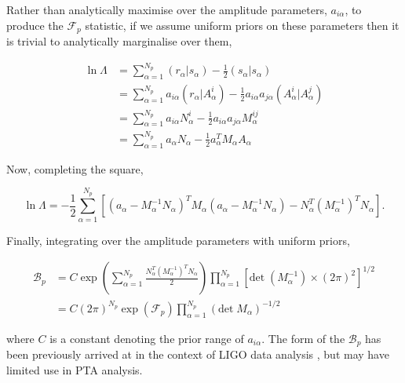 \documentclass[prd,showpacs,nofootinbib]{revtex4}
\begin{document}
Rather than analytically maximise over the amplitude parameters, $a_{i\alpha}$, to produce the $\mathcal{F}_p$ statistic, if we assume uniform priors on these parameters then it is trivial to analytically marginalise over them,

\begin{align}
\ln\Lambda &= \sum_{\alpha=1}^{N_p} (r_{\alpha}|s_{\alpha}) - \frac{1}{2}(s_{\alpha}|s_{\alpha}) \nonumber\\
&= \sum_{\alpha=1}^{N_p} a_{i\alpha}(r_{\alpha}|A^i_{\alpha}) - \frac{1}{2}a_{i\alpha}a_{j\alpha}(A^i_{\alpha}|A^j_{\alpha}) \nonumber\\
&= \sum_{\alpha=1}^{N_p} a_{i\alpha}N^i_{\alpha} - \frac{1}{2}a_{i\alpha}a_{j\alpha}M^{ij}_{\alpha} \nonumber\\
&= \sum_{\alpha=1}^{N_p} a_{\alpha}N_{\alpha} - \frac{1}{2}a_{\alpha}^T M_{\alpha}A_{\alpha}
\end{align}

Now, completing the square,

\begin{equation}
\ln\Lambda = -\frac{1}{2}\sum_{\alpha=1}^{N_p}\left[\left(a_{\alpha}-M_{\alpha}^{-1}N_{\alpha}\right)^T M_{\alpha}\left(a_{\alpha}-M_{\alpha}^{-1}N_{\alpha}\right) - N_{\alpha}^T \left(M_{\alpha}^{-1}\right)^T N_{\alpha}\right].
\end{equation}

Finally, integrating over the amplitude parameters with uniform priors,%

\begin{align}
\mathcal{B}_p &= C\exp\left(\sum_{\alpha=1}^{N_p}\frac{N_{\alpha}^T \left(M_{\alpha}^{-1}\right)^T N_{\alpha}}{2}\right)\prod_{\alpha=1}^{N_p}\left[\text{det}\;\left(M_{\alpha}^{-1}\right)\times \left(2\pi\right)^2\right]^{1/2} \nonumber\\
&= C\left(2\pi\right)^{N_p}\exp\left(\mathcal{F}_p\right) \prod_{\alpha=1}^{N_p} \left(\text{det}\;M_{\alpha}\right)^{-1/2}
\end{align}

where $C$ is a constant denoting the prior range of $a_{i\alpha}$. The form of the $\mathcal{B}_p$ has been previously arrived at in the context of LIGO data analysis \citep{prix_bp}, but may have limited use in PTA analysis.

\end{document}
